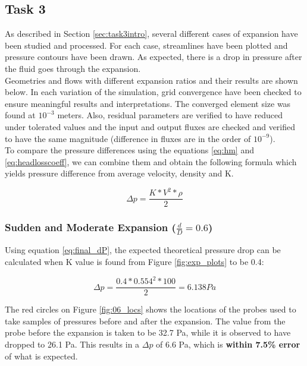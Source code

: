 \subsection{Task 3}

As described in Section \ref{sec:task3intro}, several different cases of expansion have been studied and processed. For each case, streamlines have been plotted and pressure contours have been drawn. As expected, there is a drop in pressure after the fluid goes through the expansion. \\

\noindent Geometries and flows with different expansion ratios and their results are shown below. In each variation of the simulation, grid convergence have been checked to ensure meaningful results and interpretations. The converged element size was found at $10^{-3}$ meters. Also, residual parameters are verified to have reduced under tolerated values and the input and output fluxes are checked and verified to have the same magnitude (difference in fluxes are in the order of $10^{-9}$).\\

\noindent To compare the pressure differences using the equations \ref{eq:hm} and \ref{eq:headlosscoeff}, we can combine them and obtain the following formula which yields pressure difference from average velocity, density and K.

\begin{equation}
    \Delta p = \frac{K * V^2 * \rho}{2}
    \label{eq:final_dP}
\end{equation}

\subsubsection{Sudden and Moderate Expansion ($\frac{d}{D} = 0.6$)}

Using equation \ref{eq:final_dP}, the expected theoretical pressure drop can be calculated when K value is found from Figure \ref{fig:exp_plots} to be 0.4:

\[\Delta p = \frac{0.4 * 0.554^2 * 100}{2} = 6.138Pa \]


\noindent The red circles on Figure \ref{fig:06_locs} shows the locations of the probes used to take samples of pressures before and after the expansion. The value from the probe before the expansion is taken to be 32.7 Pa, while it is observed to have dropped to 26.1 Pa. This results in a $\Delta p$ of 6.6 Pa, which is \textbf{within 7.5\% error} of what is expected.

